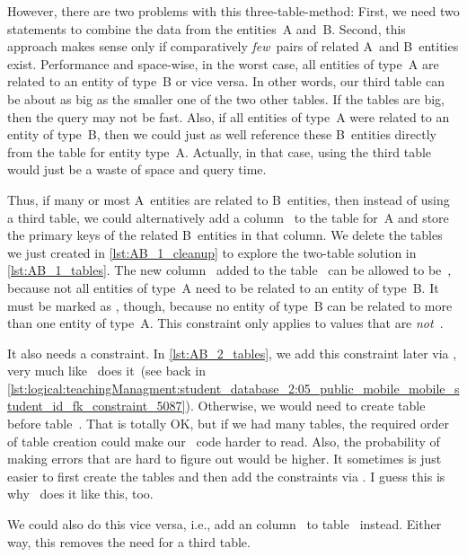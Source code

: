 However, there are two problems with this three-table-method:
First, we need two  statements to combine the data from the entities~A and~B.
Second, this approach makes sense only if comparatively \emph{few}~pairs of related A~and B~entities exist.
Performance and space-wise, in the worst case, all entities of type~A are related to an entity of type~B or vice versa.
In other words, our third table can be about as big as the smaller one of the two other tables.
If the tables are big, then the query may not be fast.
Also, if all entities of type~A were related to an entity of type~B, then we could just as well reference these B~entities directly from the table for entity type~A.
Actually, in that case, using the third table would just be a waste of space and query time.

Thus, if many or most A~entities are related to B~entities, then instead of using a third table, we could alternatively add a column~ to the table for~A and store the primary keys of the related B~entities in that column.
We delete the tables we just created in \cref{lst:AB_1_cleanup} to explore the two-table solution in \cref{lst:AB_1_tables}.
The new column~ added to the table~ can be allowed to be~, because not all entities of type~A need to be related to an entity of type~B.
It must be marked as , though, because no entity of type~B can be related to more than one entity of type~A.
This constraint only applies to values that are \emph{not}~.

It also needs a  constraint.
In \cref{lst:AB_2_tables}, we add this constraint later via , very much like \pgmodeler\ does it~(see back in \cref{lst:logical:teachingManagment:student_database_2:05_public_mobile_mobile_student_id_fk_constraint_5087}).
Otherwise, we would need to create table~ before table~.
That is totally OK, but if we had many tables, the required order of table creation could make our \sql\ code harder to read.
Also, the probability of making errors that are hard to figure out would be higher.
It sometimes is just easier to first create the tables and then add the constraints via .
I guess this is why \pgmodeler\ does it like this, too.

We could also do this vice versa, i.e., add an column~ to table~ instead.
Either way, this removes the need for a third table.

